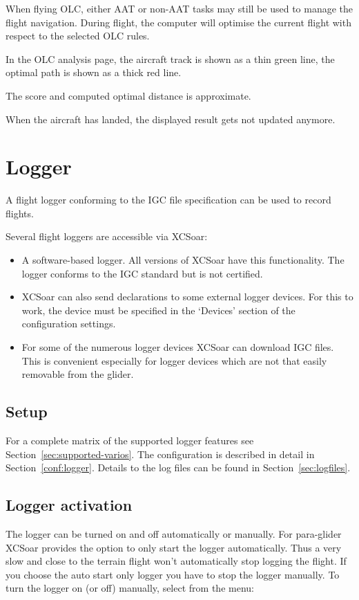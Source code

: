 When flying OLC, either AAT or non-AAT tasks may still be used to
manage the flight navigation.  During flight, the computer will optimise the
current flight with respect to the selected OLC rules.  

In the OLC analysis page, the aircraft track is shown as a thin green line, the optimal 
path is shown as a thick red line.

The score and computed optimal distance is approximate.

When the aircraft has landed, the displayed result gets not updated anymore.


\section{Logger}\label{sec:logger}

A flight logger conforming to the IGC file specification can be used
to record flights.  

Several flight loggers are accessible via XCSoar:
\begin{itemize}
\item A software-based logger.  All versions of XCSoar have this
  functionality.  The logger conforms to the IGC standard but is not
  certified.
\item XCSoar can also send declarations to some external logger devices. 
  For this to work, the device must be specified in the `Devices' 
  section of the configuration  settings.
\item  For some of the numerous logger devices XCSoar can download IGC files. 
  This is convenient especially for logger devices which are not that easily
  removable from the glider.
\end{itemize}

\subsection*{Setup}
For a complete matrix of the supported logger features see Section~\ref{sec:supported-varios}.
The configuration is described in detail in Section~\ref{conf:logger}.  Details
to the log files can be found in Section~\ref{sec:logfiles}.

\subsection*{Logger activation}
The logger can be turned on and off automatically or manually.  For para-glider 
XCSoar provides the option to only start the logger automatically. Thus a very 
slow and close to the terrain flight won't automatically stop logging the flight. 
If you choose the auto start only logger you have to stop the logger manually.
To turn the logger on (or off) manually, select from the menu:
\begin{quote}
\blink{}
\end{quote}


